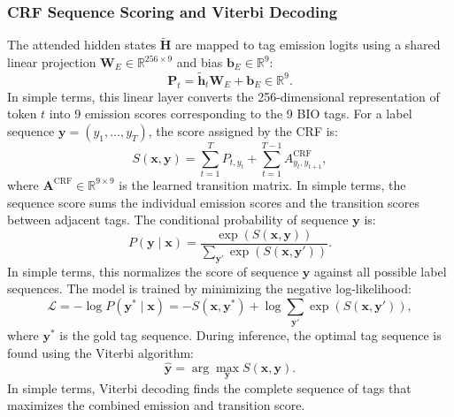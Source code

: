 \documentclass[pdflatex,sn-mathphys-num]{sn-jnl}
\begin{document}
\subsubsection{CRF Sequence Scoring and Viterbi Decoding}
The attended hidden states $\tilde{\mathbf{H}}$ are mapped to tag emission logits using a shared linear projection $\mathbf{W}_E \in \mathbb{R}^{256 \times 9}$ and bias $\mathbf{b}_E \in \mathbb{R}^9$:
\begin{equation}
\mathbf{P}_t = \tilde{\mathbf{h}}_t \mathbf{W}_E + \mathbf{b}_E \in \mathbb{R}^9.
\end{equation}
In simple terms, this linear layer converts the 256-dimensional representation of token $t$ into 9 emission scores corresponding to the 9 BIO tags. For a label sequence $\mathbf{y} = (y_1, \ldots, y_T)$, the score assigned by the CRF is:
\begin{equation}
S(\mathbf{x}, \mathbf{y}) = \sum_{t=1}^T P_{t, y_t} + \sum_{t=1}^{T-1} A^{\text{CRF}}_{y_t, y_{t+1}},
\end{equation}
where $\mathbf{A}^{\text{CRF}} \in \mathbb{R}^{9 \times 9}$ is the learned transition matrix. In simple terms, the sequence score sums the individual emission scores and the transition scores between adjacent tags. The conditional probability of sequence $\mathbf{y}$ is:
\begin{equation}
P(\mathbf{y} \mid \mathbf{x}) = \frac{\exp(S(\mathbf{x}, \mathbf{y}))}{\sum_{\mathbf{y}'} \exp(S(\mathbf{x}, \mathbf{y}'))}.
\end{equation}
In simple terms, this normalizes the score of sequence $\mathbf{y}$ against all possible label sequences. The model is trained by minimizing the negative log-likelihood:
\begin{equation}
\mathcal{L} = -\log P(\mathbf{y}^* \mid \mathbf{x}) = -S(\mathbf{x}, \mathbf{y}^*) + \log \sum_{\mathbf{y}'} \exp(S(\mathbf{x}, \mathbf{y}')),
\end{equation}
where $\mathbf{y}^*$ is the gold tag sequence. During inference, the optimal tag sequence is found using the Viterbi algorithm:
\begin{equation}
\hat{\mathbf{y}} = \arg\max_{\mathbf{y}} S(\mathbf{x}, \mathbf{y}).
\end{equation}
In simple terms, Viterbi decoding finds the complete sequence of tags that maximizes the combined emission and transition score.
\end{document}
